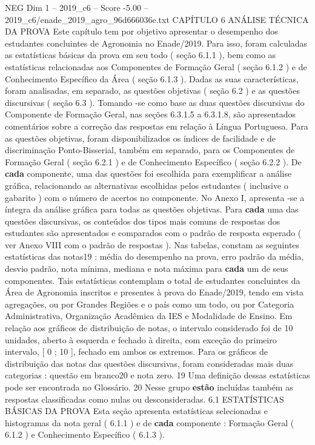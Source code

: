 \begin{textsample}{NEG Dim 1 – 2019\_c6 – Score -5.00 – 2019\_c6/enade\_2019\_agro\_96d666036e.txt}  \label{ex:f1_neg_099}
CAPÍTULO 6 ANÁLISE TÉCNICA DA PROVA Este capítulo tem por objetivo apresentar o desempenho dos estudantes concluintes de Agronomia no Enade/2019.
Para isso, foram calculadas as estatísticas básicas da prova em seu todo ( seção 6.1.1 ), bem como as estatísticas relacionadas aos Componentes de Formação Geral ( seção 6.1.2 ) e de Conhecimento Específico da Área ( seção 6.1.3 ).
Dadas as suas características, foram analisadas, em separado, as questões objetivas ( seção 6.2 ) e as questões discursivas ( seção 6.3 ).
Tomando -se como base as duas questões discursivas do Componente de Formação Geral, nas seções 6.3.1.5 a 6.3.1.8, são apresentados comentários sobre a correção das respostas em relação à Língua Portuguesa.
Para as questões objetivas, foram disponibilizados os índices de facilidade e de discriminação Ponto-Bisserial, também em separado, para os Componentes de Formação Geral ( seção 6.2.1 ) e de Conhecimento Específico ( seção 6.2.2 ).
De \textbf{cada} componente, uma das questões foi escolhida para exemplificar a análise gráfica, relacionando as alternativas escolhidas pelos estudantes ( inclusive o gabarito ) com o número de acertos no componente.
No Anexo I, apresenta -se a íntegra da análise gráfica para todas as questões objetivas.
Para \textbf{cada} uma das questões discursivas, os conteúdos dos tipos mais comuns de respostas dos estudantes são apresentados e comparados com o padrão de resposta esperado ( ver Anexo VIII com o padrão de respostas ).
Nas tabelas, constam as seguintes estatísticas das notas19 : média do desempenho na prova, erro padrão da média, desvio padrão, nota mínima, mediana e nota máxima para \textbf{cada} um de seus componentes.
Tais estatísticas contemplam o total de estudantes concluintes da Área de Agronomia inscritos e presentes à prova do Enade/2019, tendo em vista agregações, ou por Grandes Regiões e o país como um todo, ou por Categoria Administrativa, Organização Acadêmica da IES e Modalidade de Ensino.
Em relação aos gráficos de distribuição de notas, o intervalo considerado foi de 10 unidades, aberto à esquerda e fechado à direita, com exceção do primeiro intervalo, [ 0 ; 10 ], fechado em ambos os extremos.
Para os gráficos de distribuição das notas das questões discursivas, foram consideradas mais duas categorias : questão em branco20 e nota zero. 19 Uma definição dessas estatísticas pode ser encontrada no Glossário. 20 Nesse grupo \textbf{estão} incluídas também as respostas classificadas como nulas ou desconsideradas. 6.1 ESTATÍSTICAS BÁSICAS DA PROVA Esta seção apresenta estatísticas selecionadas e histogramas da nota geral ( 6.1.1 ) e de \textbf{cada} componente : Formação Geral ( 6.1.2 ) e Conhecimento Específico ( 6.1.3 ).

\end{textsample}
